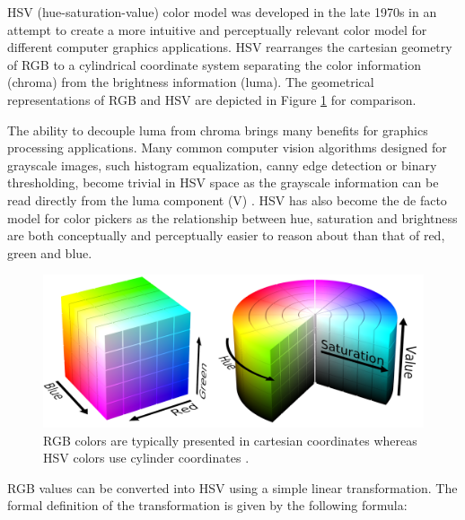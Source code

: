\documentclass[thesis.tex]{subfiles}
\begin{document}
HSV (hue-saturation-value) color model was developed in the late 1970s in an attempt to create a more intuitive and perceptually relevant color model for different computer graphics applications. HSV rearranges the cartesian geometry of RGB to a cylindrical coordinate system separating the color information (chroma) from the brightness information (luma). The geometrical representations of RGB and HSV are depicted in Figure \ref{figure:rgb_hsv} for comparison.

The ability to decouple luma from chroma brings many benefits for graphics processing applications. Many common computer vision algorithms designed for grayscale images, such histogram equalization, canny edge detection or binary thresholding, become trivial in HSV space as the grayscale information can be read directly from the luma component (V) \cite{color_segmentation}. HSV has also become the de facto model for color pickers as the relationship between hue, saturation and brightness are both conceptually and perceptually easier to reason about than that of red, green and blue.

\begin{figure}[ht]
\centering \includegraphics[width=\textwidth]{images/rgb_hsv}
\caption{RGB colors are typically presented in cartesian coordinates whereas HSV colors use cylinder coordinates \cite{hsv_cylinder}\cite{rgb_cube}.\label{figure:rgb_hsv}}
\end{figure}

RGB values can be converted into HSV using a simple linear transformation. The formal definition of the transformation is given by the following formula:
\end{document}
